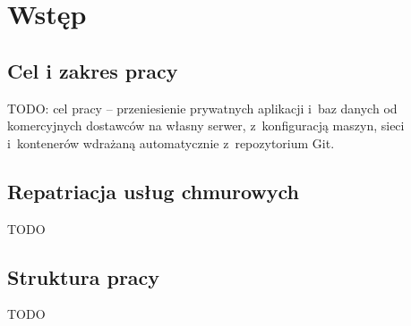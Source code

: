 \chapter{Wstęp}

\section{Cel i zakres pracy}
TODO: cel pracy -- przeniesienie prywatnych aplikacji i~baz danych od komercyjnych dostawców na własny serwer, z~konfiguracją maszyn, sieci i~kontenerów wdrażaną automatycznie z~repozytorium Git.

\section{Repatriacja usług chmurowych}
TODO

\section{Struktura pracy}
TODO
